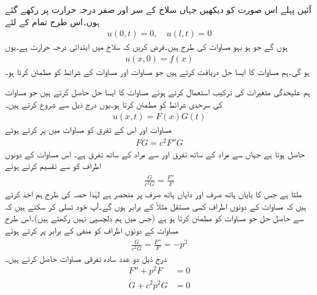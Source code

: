 آئیں پہلے اس صورت کو دیکھیں جہاں سلاخ کے سر  اور  صفر درجہ حرارت پر رکھے گئے ہوں۔اس طرح  تمام  کے لئے 
\begin{align}\label{مساوات_جزوی_حراری_ب}
u(0,t)=0,\quad u(l,t)=0
\end{align}
ہوں گے جو ہو بہو مساوات  کی طرح ہیں۔فرض کریں کہ سلاخ میں ابتدائی درجہ حرارت  ہے۔یوں 
\begin{align}\label{مساوات_جزوی_حراری_پ}
u(x,0)=f(x)
\end{align}
ہو گی۔ہم مساوات  کا ایسا حل  دریافت کرتے ہیں جو مساوات  اور مساوات  کے شرائط کو  مطمئن کرتا ہو۔

 \quad ہم علیحدگی متغیرات کی ترکیب استعمال کرتے ہوئے مساوات  کا ایسا حل حاصل کرتے ہیں جو مساوات  کی سرحدی شرائط کو مطمئن کرتا ہو۔یوں درج ذیل سے شروع کرتے ہیں۔
\begin{align}\label{مساوات_جزوی_حل_حرارت_الف}
u(x,t)=F(x)G(t)
\end{align} 
مساوات  اور اس کے تفرق کو مساوات  میں پر کرتے ہوئے
\begin{align*}
F\dot{G}=c^2F''G
\end{align*}
حاصل ہوتا ہے  جہاں  سے مراد  کے ساتھ تفرق اور  سے مراد  کے ساتھ تفرق ہے۔ اس مساوات کے دونوں اطراف کو  سے تقسیم کرتے ہوئے
\begin{align}\label{مساوات_جزوی_حل_حرارت_ب}
\frac{\dot{G}}{c^2G}=\frac{F''}{F}
\end{align} 
ملتا ہے جس کا بایاں ہاتھ صرف  اور دایاں ہاتھ صرف  پر منحصر ہے لہٰذا حصہ  کی طرح  ہم اخذ کرتے ہیں کہ  مساوات  کے دونوں اطراف کسی مستقل مثلاً  کے برابر ہوں گے۔آپ خود تسلی کر سکتے ہیں کہ  سے حاصل حل  جو مساوات  کو مطمئن کرتا ہو  ہے (جس میں ہم دلچسپی نہیں رکھتے ہیں)۔اس طرح  مساوات  کے دونوں اطراف کو منفی  کے برابر پر کرتے ہوئے
\begin{align*}
\frac{\dot{G}}{c^2G}=\frac{F''}{F}=-p^2
\end{align*}
 درج ذیل دو عدد سادہ تفرقی مساوات حاصل کرتے ہیں۔
\begin{align}
F''+p^2F&=0\label{مساوات_جزوی_حل_حرارت_پ}\\
\dot{G}+c^2p^2G&=0\label{مساوات_جزوی_حل_حرارت_ت}
\end{align}

